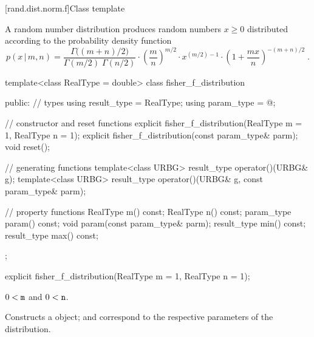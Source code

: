 
[rand.dist.norm.f]{Class template }%
%
%

\pnum
A  random number distribution
produces random numbers $x\ge0$
distributed according to
the probability density function%
%
%
\[%
 p(x\,|\,m,n)
      = \frac{\Gamma\big((m+n)/2\big)}
             {\Gamma(m/2) \; \Gamma(n/2)}
        \cdot
        \left(\frac{m}{n}\right)^{m/2}
        \cdot
        x^{(m/2)-1}
        \cdot
        {\left( 1 + \frac{m x}{n}  \right)}^{-(m+n)/2}
\; \mbox{.}
\]

%
\begin{codeblock}
template<class RealType = double>
  class fisher_f_distribution {
  public:
    // types
    using result_type = RealType;
    using param_type  = @\unspec@;

    // constructor and reset functions
    explicit fisher_f_distribution(RealType m = 1, RealType n = 1);
    explicit fisher_f_distribution(const param_type& parm);
    void reset();

    // generating functions
    template<class URBG>
      result_type operator()(URBG& g);
    template<class URBG>
      result_type operator()(URBG& g, const param_type& parm);

    // property functions
    RealType m() const;
    RealType n() const;
    param_type param() const;
    void param(const param_type& parm);
    result_type min() const;
    result_type max() const;
  };
\end{codeblock}


%
\begin{itemdecl}
explicit fisher_f_distribution(RealType m = 1, RealType n = 1);
\end{itemdecl}

\begin{itemdescr}
\pnum\requires
 $ 0 < \texttt{\protect m} $ and $ 0 < \texttt{\protect n} $.

\pnum\effects Constructs a  object;
  and 
 correspond to the respective parameters of the distribution.
\end{itemdescr}

